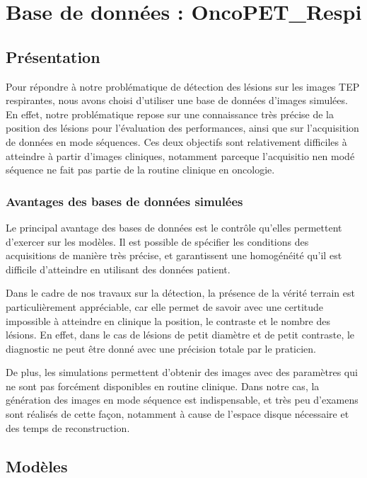 \chapter{Base de données : OncoPET_Respi}
	\label{lab:bdd}

\section{Présentation}

Pour répondre à notre problématique de détection des lésions sur les images TEP respirantes, nous avons choisi d’utiliser une base de données d’images simulées. En effet, notre problématique repose sur une connaissance très précise de la position des lésions pour l’évaluation des performances, ainsi que sur l’acquisition de données en mode séquences. Ces deux objectifs sont relativement difficiles à atteindre à partir d’images cliniques, notamment parceque l'acquisitio nen modé séquence ne fait pas partie de la routine clinique en oncologie.

	\subsection{Avantages des bases de données simulées}

Le principal avantage des bases de données est le contrôle qu'elles permettent d'exercer sur les modèles. Il est possible de spécifier les conditions des acquisitions de manière très précise, et garantissent une homogénéité qu'il est difficile d'atteindre en utilisant des données patient.

Dans le cadre de nos travaux sur la détection, la présence de la vérité terrain est particulièrement appréciable, car elle permet de savoir avec une certitude impossible à atteindre en clinique la position, le contraste et le nombre des lésions. En effet, dans le cas de lésions de petit diamètre et de petit contraste, le diagnostic ne peut être donné avec une précision totale par le praticien. 

De plus, les simulations permettent d’obtenir des images avec des paramètres qui ne sont pas forcément disponibles en routine clinique. Dans notre cas, la génération des images en mode séquence est indispensable, et très peu d’examens sont réalisés de cette façon, notamment à cause de l’espace disque nécessaire et des temps de reconstruction.

	\section{Modèles}

